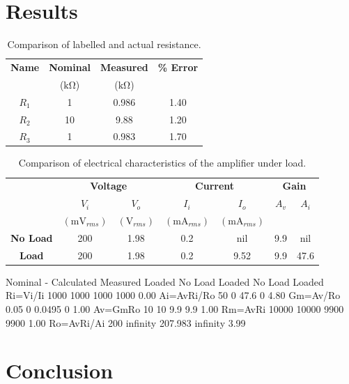 \documentclass{article}
\begin{document}
\section{Results}
\label{sec:results}

\begin{table}[hbtp]
  \label{tab:table_01}
  \centering
  \begin{tabular}{*{4}{c}}
    \textbf{Name} & \textbf{Nominal} & \textbf{Measured} & \textbf{\% Error} \\
    & ($\si{\kilo\ohm}$) & ($\si{\kilo\ohm}$) & \\
    \hline
    $R_1$ & 1 & 0.986 & 1.40 \\
    $R_2$ & 10 & 9.88 & 1.20 \\
    $R_3$ & 1 & 0.983 & 1.70 \\
  \end{tabular}
  \caption{Comparison of labelled and actual resistance.}
\end{table}

\begin{table}[hbtp]
  \label{tab:table_02}
  \centering
  \begin{tabular}{*{7}{c}}
    & \multicolumn{2}{c}{\textbf{Voltage}} & \multicolumn{2}{c}{\textbf{Current}} & \multicolumn{2}{c}{\textbf{Gain}} \\
    & $V_i$ & $V_o$ & $I_i$ & $I_o$ & $A_v$ & $A_i$ \\
    & $(\si{\milli\volt_{rms}})$ & $(\si{\volt_{rms}})$ & $(\si{\milli\ampere_{rms}})$ & $(\si{\milli\ampere_{rms}})$ & & \\
    \hline
    \textbf{No Load} & 200 & 1.98 & 0.2 & nil & 9.9 & nil \\
    \textbf{Load} & 200 & 1.98 & 0.2 & 9.52 & 9.9 & 47.6 \\
  \end{tabular}
  \caption{Comparison of electrical characteristics of the amplifier under load.}
\end{table}

	Nominal - Calculated		Measured		
	Loaded	No Load	Loaded	No Load	Loaded %
Ri=Vi/Ii	1000	1000	1000	1000	0.00%
Ai=AvRi/Ro	50	0	47.6	0	4.80%
Gm=Av/Ro	0.05	0	0.0495	0	1.00%
Av=GmRo	10	10	9.9	9.9	1.00%
Rm=AvRi	10000	10000	9900	9900	1.00%
Ro=AvRi/Ai	200	infinity	207.983	infinity	3.99%
\section{Conclusion}
\label{sec:conclusion}
\end{document}

